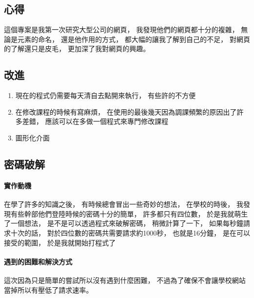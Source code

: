\documentclass[12pt]{ctexart}
\begin{document}

\clearpage
\subsection{心得}
這個專案是我第一次研究大型公司的網頁，
我發現他們的網頁都十分的複雜，
無論是元素的命名，
還是他作用的方式，
都大幅的讓我了解到自己的不足，
對網頁的了解還只是皮毛，
更加深了我對網頁的興趣。

\subsection{改進}
\begin{adjustwidth}{2em}{0em}
\begin{enumerate}
    \item
        現在的程式仍需要每天清自去點開來執行，
        有些許的不方便
    \item 
        在修改課程的時候有寫麻煩，
        在使用的最後幾天因為調課頻繁的原因出了許多差錯，
        應該可以在多做一個程式來專門修改課程
    \item  
        圖形化介面
\end{enumerate}
\end{adjustwidth}



\clearpage
\subsection{ 密碼破解 }
\paragraph{ 實作動機 }
\begin{adjustwidth}{2em}{0em}
    在學了許多的知識之後，
    有時候總會冒出一些奇妙的想法，
    在學校的時後，
    我發現有些幹部他們登陸時候的密碼十分的簡單，
    許多都只有四位數，
    於是我就萌生了一個想法，
    是不是可以透過程式來破解密碼，
    稍微計算了一下，
    如果每秒鐘請求十次的話，
    對於四位數的密碼共需要請求約1000秒，
    也就是16分鐘，
    是在可以接受的範圍，
    於是我就開始打程式了
\end{adjustwidth}

\paragraph{ 遇到的困難和解決方式 }
\begin{adjustwidth}{2em}{0em}
    這次因為只是簡單的嘗試所以沒有遇到什麼困難，
    不過為了確保不會讓學校網站當掉所以有壓低了請求速率。
\end{adjustwidth}
\end{document}
